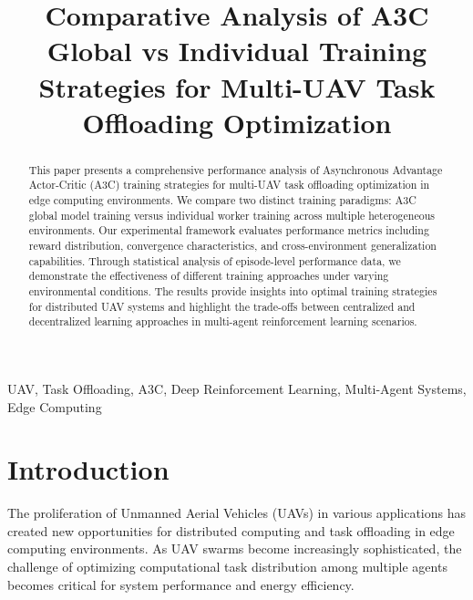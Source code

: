 \documentclass[journal]{IEEEtran}
\begin{document}
\title{Comparative Analysis of A3C Global vs Individual Training Strategies for Multi-UAV Task Offloading Optimization}

\author{%
%
}

\maketitle

\begin{abstract}
This paper presents a comprehensive performance analysis of Asynchronous Advantage Actor-Critic (A3C) training strategies for multi-UAV task offloading optimization in edge computing environments. We compare two distinct training paradigms: A3C global model training versus individual worker training across multiple heterogeneous environments. Our experimental framework evaluates performance metrics including reward distribution, convergence characteristics, and cross-environment generalization capabilities. Through statistical analysis of episode-level performance data, we demonstrate the effectiveness of different training approaches under varying environmental conditions. The results provide insights into optimal training strategies for distributed UAV systems and highlight the trade-offs between centralized and decentralized learning approaches in multi-agent reinforcement learning scenarios.
\end{abstract}

\begin{IEEEkeywords}
UAV, Task Offloading, A3C, Deep Reinforcement Learning, Multi-Agent Systems, Edge Computing
\end{IEEEkeywords}

\section{Introduction}
\label{sec:introduction}

The proliferation of Unmanned Aerial Vehicles (UAVs) in various applications has created new opportunities for distributed computing and task offloading in edge computing environments. As UAV swarms become increasingly sophisticated, the challenge of optimizing computational task distribution among multiple agents becomes critical for system performance and energy efficiency.
\end{document}
